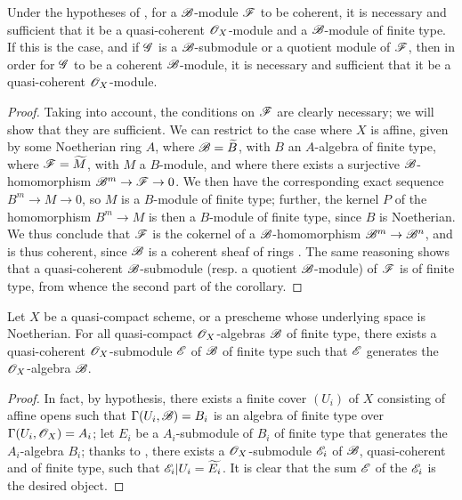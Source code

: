 \begin{corollary}[9.6.4]
\label{1.9.6.4}
Under the hypotheses of , for a $\mathscr{B}$-module $\mathscr{F}$ to be coherent, it is necessary and sufficient that it be a quasi-coherent $\mathscr{O}_X$-module and a $\mathscr{B}$-module of finite type.
If this is the case, and if $\mathscr{G}$ is a $\mathscr{B}$-submodule or a quotient module of $\mathscr{F}$, then in order for $\mathscr{G}$ to be a coherent $\mathscr{B}$-module, it is necessary and sufficient that it be a quasi-coherent $\mathscr{O}_X$-module.
\end{corollary}

\begin{proof}
\label{proof-1.9.6.4}
Taking  into account, the conditions on $\mathscr{F}$ are clearly necessary; we will show that they are sufficient.
We can restrict to the case where $X$ is affine, given by some Noetherian ring $A$, where $\mathscr{B}={\widetilde{B}}$, with $B$ an $A$-algebra of finite type, where $\mathscr{F}={\widetilde{M}}$, with $M$ a $B$-module, and where there exists a surjective $\mathscr{B}$-homomorphism $\sh{B}^m\to\sh{F}\to0$.
We then have the corresponding exact sequence $B^m\to M\to0$, so $M$ is a $B$-module of finite type; further, the kernel $P$ of the homomorphism $B^m\to M$ is then a $B$-module of finite type, since $B$ is Noetherian.
We thus conclude  that $\mathscr{F}$ is the cokernel of a $\mathscr{B}$-homomorphism $\sh{B}^m\to\sh{B}^n$, and is thus coherent, since $\mathscr{B}$ is a coherent sheaf of rings .
The same reasoning shows that a quasi-coherent $\mathscr{B}$-submodule (resp. a quotient $\mathscr{B}$-module) of $\mathscr{F}$ is of finite type, from whence the second part of the corollary.
\end{proof}

\begin{proposition}[9.6.5]
\label{1.9.6.5}
Let $X$ be a quasi-compact scheme, or a prescheme whose underlying space is Noetherian.
For all quasi-compact $\mathscr{O}_X$-algebras $\mathscr{B}$ of finite type, there exists a quasi-coherent $\mathscr{O}_X$-submodule $\mathscr{E}$ of $\mathscr{B}$ of finite type such that $\mathscr{E}$ generates  the $\mathscr{O}_X$-algebra $\mathscr{B}$.
\end{proposition}

\begin{proof}
\label{proof-1.9.6.5}
In fact, by hypothesis, there exists a finite cover $(U_i)$ of $X$ consisting of affine opens such that $\Gamma(U_i,\mathscr{B})=B_i$ is an algebra of finite type over $\Gamma(U_i,\mathscr{O}_X)=A_i$; let $E_i$ be a $A_i$-submodule of $B_i$ of finite type that generates the $A_i$-algebra $B_i$; thanks to , there exists a $\mathscr{O}_X$-submodule $\mathscr{E}_i$ of $\mathscr{B}$, quasi-coherent and of finite type, such that $\mathscr{E}_i|U_i={\widetilde{E_i}}$.
It is clear that the sum $\mathscr{E}$ of the $\mathscr{E}_i$ is the desired object.
\end{proof}

